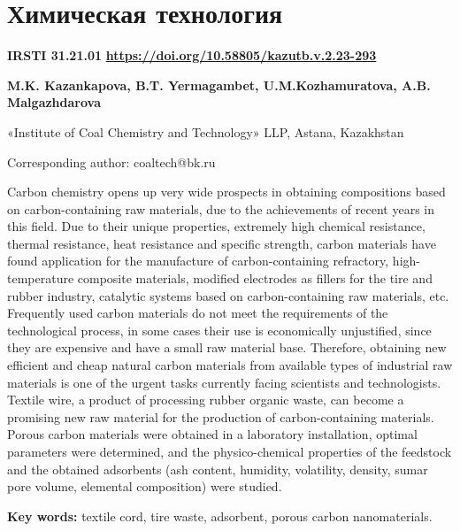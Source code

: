 \let\cleardoublepage\clearpage
\chapter{Химическая технология}

{\bfseries IRSTI 31.21.01}
\hfill {\bfseries \href{https://doi.org/10.58805/kazutb.v.2.23-293}{https://doi.org/10.58805/kazutb.v.2.23-293}}


\begin{center}
{\bfseries M.K. Kazankapova\envelope, B.T. Yermagambet, U.M.Kozhamuratova, A.B. Malgazhdarova}

«Institute of Coal Chemistry and Technology» LLP, Astana, Kazakhstan

\envelope Corresponding author: coaltech@bk.ru
\end{center}

Carbon chemistry opens up very wide prospects in obtaining compositions
based on carbon-containing raw materials, due to the achievements of
recent years in this field. Due to their unique properties, extremely
high chemical resistance, thermal resistance, heat resistance and
specific strength, carbon materials have found application for the
manufacture of carbon-containing refractory, high-temperature composite
materials, modified electrodes as fillers for the tire and rubber
industry, catalytic systems based on carbon-containing raw materials,
etc. Frequently used carbon materials do not meet the requirements of
the technological process, in some cases their use is economically
unjustified, since they are expensive and have a small raw material
base. Therefore, obtaining new efficient and cheap natural carbon
materials from available types of industrial raw materials is one of the
urgent tasks currently facing scientists and technologists. Textile
wire, a product of processing rubber organic waste, can become a
promising new raw material for the production of carbon-containing
materials. Porous carbon materials were obtained in a laboratory
installation, optimal parameters were determined, and the
physico-chemical properties of the feedstock and the obtained adsorbents
(ash content, humidity, volatility, density, sumar pore volume,
elemental composition) were studied.

{\bfseries Key words:} textile cord, tire waste, adsorbent, porous carbon
nanomaterials.

